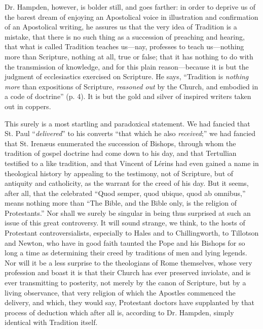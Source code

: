 Dr. Hampden, however, is bolder still, and goes
farther: in order to deprive us of the barest dream of enjoying an
Apostolical voice in illustration and confirmation of an Apostolical
writing, he assures us that the very idea of Tradition is a
mistake, that there is no such thing as a succession of preaching and
hearing, that what is called Tradition teaches us—nay, professes to
teach us—nothing more than Scripture, nothing at all, true or false;
that it has nothing to do with the transmission of knowledge, and for
this plain reason—because it is but the judgment of ecclesiastics
exercised on Scripture. He says, ``Tradition is \emph{nothing more}
than expositions of Scripture, \emph{reasoned out} by the Church, and
embodied in a code of doctrine'' (p. 4). It is but the gold and silver
of inspired writers taken out in coppers.

This surely is a most startling and paradoxical
statement. We had fancied that St. Paul ``\emph{delivered}'' to his
converts ``that which he also \emph{received};'' we had fancied that St.
Irenæus enumerated the succession of Bishops, through whom the
tradition of gospel doctrine had come down to his day, and that
Tertullian testified to a like tradition, and that Vincent of Lérins
had even gained a name in theological history by appealing to the
testimony, not of Scripture, but of antiquity and catholicity, as the
warrant for the creed of his day. But it seems, after all, that the
celebrated ``Quod semper, quod ubique, quod ab omnibus,'' means nothing
more than ``The Bible, and the Bible only, is the religion of
Protestants.'' Nor shall we surely be singular in being thus surprised
at such an issue of this great controversy. It will sound strange, we
think, to the hosts of Protestant controversialists, especially to
Hales and to Chillingworth, to Tillotson and Newton, who have in good
faith taunted the Pope and his Bishops for so long a time as
determining their creed by traditions of men and lying legends. Nor
will it be a less surprise to the theologians of Rome themselves,
whose very profession and boast it is that their Church has ever preserved inviolate, and is ever transmitting to posterity, not merely
by the canon of Scripture, but by a living observance, that very
religion of which the Apostles commenced the delivery, and which, they
would say, Protestant doctors have supplanted by that process of
deduction which after all is, according to Dr. Hampden, simply
identical with Tradition itself.

